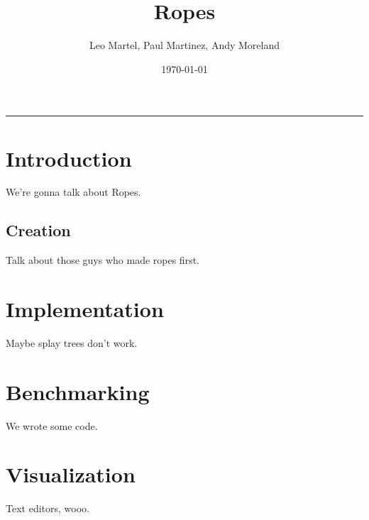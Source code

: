 \documentclass[12pt]{article}
\title{Ropes}
\author{Leo Martel, Paul Martinez, Andy Moreland}
\date{\today}
\begin{document}
\maketitle
\vspace{-0.3in}
\rule{\linewidth}{0.4pt}


\section{Introduction}

We're gonna talk about Ropes.

\subsection{Creation}

Talk about those guys who made ropes first.

\section{Implementation}

Maybe splay trees don't work.

\section{Benchmarking}

We wrote some code.

\section{Visualization}

Text editors, wooo.
\end{document}
